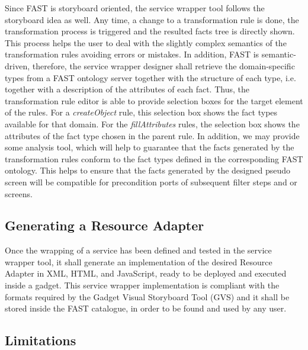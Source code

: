 \documentclass{fast_latex}
\begin{document}
Since FAST is storyboard oriented, the service wrapper tool follows the storyboard idea as well. Any time, a change to a transformation rule is done, the transformation process is triggered and the resulted facts tree is directly shown. This process helps the user to deal with the slightly complex semantics of the transformation rules avoiding errors or mistakes. In addition, FAST is semantic-driven, therefore, the service wrapper designer shall retrieve the domain-specific types from a FAST ontology server together with the structure of each type, i.e. together with a description of the attributes of each fact. Thus, the transformation rule editor is able to provide selection boxes for the target element of the rules. For a \emph{createObject} rule, this selection box shows the fact types available for that domain. For the \emph{fillAttributes} rules, the selection box shows the attributes of the fact type chosen in the parent rule. In addition, we may provide some analysis tool, which will help to guarantee that the facts generated by the transformation rules conform to the fact types defined in the corresponding FAST ontology. This helps to ensure that the facts generated by the designed pseudo screen will be compatible for precondition ports of subsequent filter steps and or screens.



\subsection{Generating a Resource Adapter} %
\label{sub:generating_a_resource_adapter}

Once the wrapping of a service has been defined and tested in the service wrapper tool, it shall generate an implementation of the desired Resource Adapter in XML, HTML, and JavaScript, ready to be deployed and executed inside a gadget. This service wrapper implementation is compliant with the formats required by the Gadget Visual Storyboard Tool (GVS) and it shall be stored inside the FAST catalogue, in order to be found and used by any user.


\subsection{Limitations} %
\label{sub:limitations}
\end{document}
